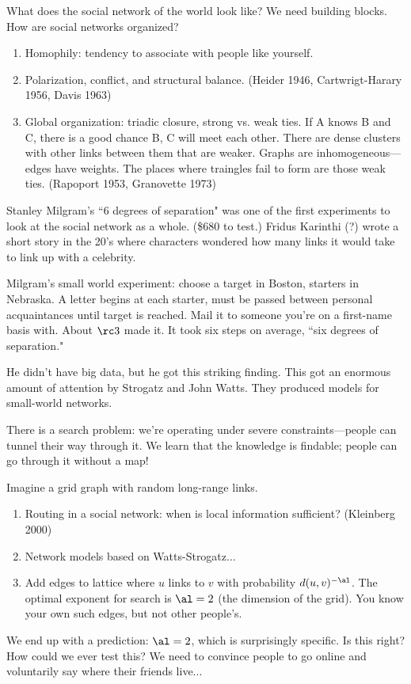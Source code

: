 What does the social network of the world look like? We need building blocks. How are social networks organized?
\begin{enumerate}
\item
Homophily: tendency to associate with people like yourself.
\item
Polarization, conflict, and structural balance. (Heider 1946, Cartwrigt-Harary 1956, Davis 1963)
\item
Global organization: triadic closure, strong vs. weak ties. If A knows B and C, there is a good chance B, C will meet each other. There are dense clusters with other links between them that are weaker. Graphs are inhomogeneous---edges have weights. The places where traingles fail to form are those weak ties. (Rapoport 1953, Granovette 1973)
\end{enumerate}
Stanley Milgram's ``6 degrees of separation" was one of the first experiments to look at the social network as a whole. (\$680 to test.) Fridus Karinthi (?) wrote a short story in the 20's where characters wondered how many links it would take to link up with a celebrity.

Milgram's small world experiment: choose a target in Boston, starters in Nebraska. A letter begins at each starter, must be passed between personal acquaintances until target is reached. Mail it to someone you're on a first-name basis with. About $\rc3$ made it. It took six steps on average, ``six degrees of separation."

He didn't have big data, but he got this striking finding. This got an enormous amount of attention by Strogatz and John Watts. They produced models for small-world networks.

There is a search problem: we're operating under severe constraints---people can tunnel their way through it. We learn that the knowledge is findable; people can go through it without a map!

Imagine a grid graph with random long-range links.
\begin{enumerate}
\item
Routing in a social network: when is local information sufficient? (Kleinberg 2000)
\item
Network models based on Watts-Strogatz...
\item Add edges to lattice where $u$ links to $v$ with probability $d(u,v)^{-\al}$. The optimal exponent for search is $\al=2$ (the dimension of the grid). You know your own such edges, but not other people's.
\end{enumerate}
We end up with a prediction: $\al=2$, which is surprisingly specific. Is this right? How could we ever test this? We need to convince people to go online and voluntarily say where their friends live... 

